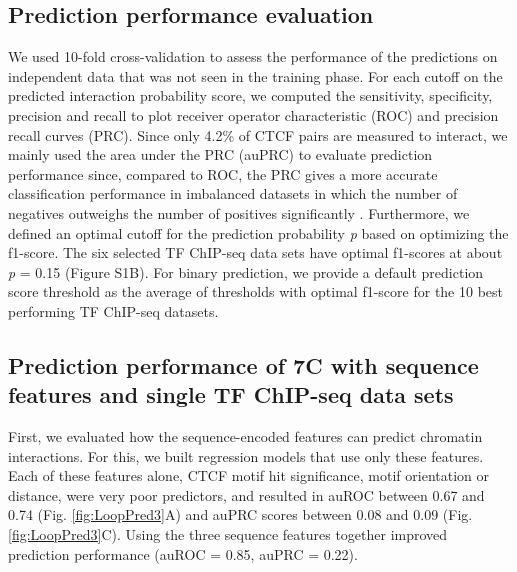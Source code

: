 \documentclass[a4paper,twoside=true,openright,parskip=full,chapterprefix=true,11pt,headings=normal,bibliography=totoc,listof=totoc,titlepage=on,captions=tableabove,draft=false]{scrreprt}
\theoremstyle{definition}
\theoremstyle{definition}
\theoremstyle{definition}
\theoremstyle{remark}
\begin{document}
\hypertarget{prediction-performance-evaluation}{%
\subsection{Prediction performance
evaluation}\label{prediction-performance-evaluation}}

We used 10-fold cross-validation to assess the performance of the
predictions on independent data that was not seen in the training phase.
For each cutoff on the predicted interaction probability score, we
computed the sensitivity, specificity, precision and recall to plot
receiver operator characteristic (ROC) and precision recall curves
(PRC). Since only 4.2\% of CTCF pairs are measured to interact, we
mainly used the area under the PRC (auPRC) to evaluate prediction
performance since, compared to ROC, the PRC gives a more accurate
classification performance in imbalanced datasets in which the number of
negatives outweighs the number of positives significantly
\citep{Saito2015}. Furthermore, we defined an optimal cutoff for the
prediction probability \emph{p} based on optimizing the f1-score. The
six selected TF ChIP-seq data sets have optimal f1-scores at about
\emph{p} = 0.15 (Figure S1B). For binary prediction, we provide a
default prediction score threshold as the average of thresholds with
optimal f1-score for the 10 best performing TF ChIP-seq datasets.

\hypertarget{prediction-performance-of-7c-with-sequence-features-and-single-tf-chip-seq-data-sets}{%
\subsection{Prediction performance of 7C with sequence features and
single TF ChIP-seq data
sets}\label{prediction-performance-of-7c-with-sequence-features-and-single-tf-chip-seq-data-sets}}

First, we evaluated how the sequence-encoded features can predict
chromatin interactions. For this, we built regression models that use
only these features. Each of these features alone, CTCF motif hit
significance, motif orientation or distance, were very poor predictors,
and resulted in auROC between 0.67 and 0.74 (Fig. \ref{fig:LoopPred3}A)
and auPRC scores between 0.08 and 0.09 (Fig. \ref{fig:LoopPred3}C).
Using the three sequence features together improved prediction
performance (auROC = 0.85, auPRC = 0.22).
\end{document}
